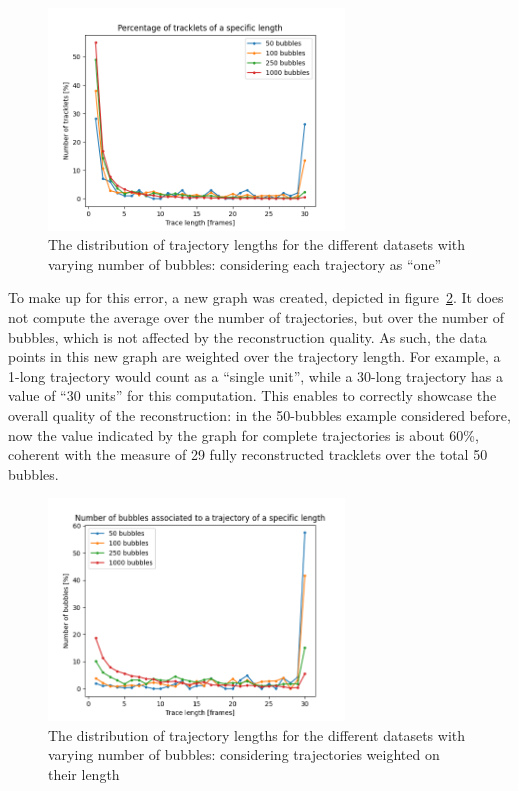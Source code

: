\begin{figure}
	\centerline{\includegraphics[width=0.7\textwidth]{images/traj-len-graph-first.png}}
	\caption{\centering The distribution of trajectory lengths for the different datasets with varying number of bubbles: considering each trajectory as ``one''}
	\label{fig:traj-len-distr}
\end{figure}

To make up for this error, a new graph was created, depicted in figure~\ref{fig:traj-len-distr-weighted}.
It does not compute the average over the number of trajectories, but over the number of bubbles, which is not affected by the reconstruction quality.
As such, the data points in this new graph are weighted over the trajectory length.
For example, a 1-long trajectory would count as a ``single unit'', while a 30-long trajectory has a value of ``30 units'' for this computation.
This enables to correctly showcase the overall quality of the reconstruction: in the 50-bubbles example considered before, now the value indicated by the graph for complete trajectories is about 60\%, coherent with the measure of 29 fully reconstructed tracklets over the total 50 bubbles.
\begin{figure}
	\centerline{\includegraphics[width=0.7\textwidth]{images/traj-len-graph.png}}
	\caption{\centering The distribution of trajectory lengths for the different datasets with varying number of bubbles: considering trajectories weighted on their length}
	\label{fig:traj-len-distr-weighted}
\end{figure}

